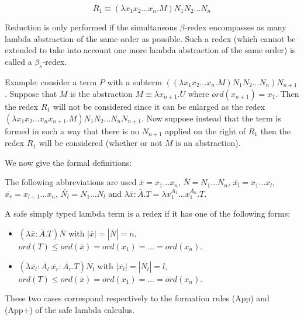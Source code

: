 $$R_1 \equiv (\lambda x_1 x_2 \ldots x_n . M) N_1 N_2 \ldots N_n$$

Reduction is only performed if the simultaneous $\beta$-redex
encompasses as many lambda abstraction of the same order as
possible. Such a redex (which cannot be extended to take into
account one more lambda abstraction of the same order) is called a
$\beta_s$-redex.


Example: consider a term $P$ with a subterm $((\lambda x_1 x_2
\ldots x_n . M) N_1 N_2 \ldots N_n) N_{n+1}$. Suppose that $M$ is
the abstraction $M \equiv \lambda x_{n+1} . U$ where $ord(x_{n+1}) =
x_1$. Then the redex $R_1$ will not be considered since it can be
enlarged as the redex $(\lambda x_1 x_2 \ldots x_n x_{n+1}. M) N_1
N_2 \ldots N_n N_{n+1}$. Now suppose instead that the term is formed
in such a way that there is no $N_{n+1}$ applied on the right of
$R_1$ then the redex $R_1$ will be considered (whether or not $M$ is
an abstraction).

We now give the formal definitions:

The following abbreviations are used $\overline{x} = x_1 \ldots
x_n$, $\overline{N} = N_1 \ldots N_n$, $\overline{x_l} = x_1 \ldots
x_l$, $\overline{x_r} = x_{l+1} \ldots x_n$, $\overline{N_l} = N_1
\ldots N_l$ and $\lambda \overline{x} : \overline{A} . T = \lambda
x_1^{A_1} \ldots x_1^{A_n} . T$.

\begin{dfn}
A safe simply typed lambda term is a redex if it has one of the
following forms:
\begin{itemize}
\item $(\lambda \overline{x} : \overline{A} . T) \overline{N}$
\quad with $|\overline{x}| = |\overline{N}| = n$, $ord(T) \leq
ord(\overline{x}) = ord(x_1) = \ldots = ord(x_n)$.

\item $(\lambda \overline{x_l} : \overline{A_l} \ \overline{x_r}: \overline{A_r} . T) \overline{N_l}$
\quad with $|\overline{x_l}| = |\overline{N_l}| = l$, $ord(T) \leq
ord(\overline{x}) = ord(x_1) = \ldots = ord(x_n)$.
\end{itemize}

These two cases correspond respectively to the formation rules (App)
and (App+) of the safe lambda calculus.

\end{dfn}

